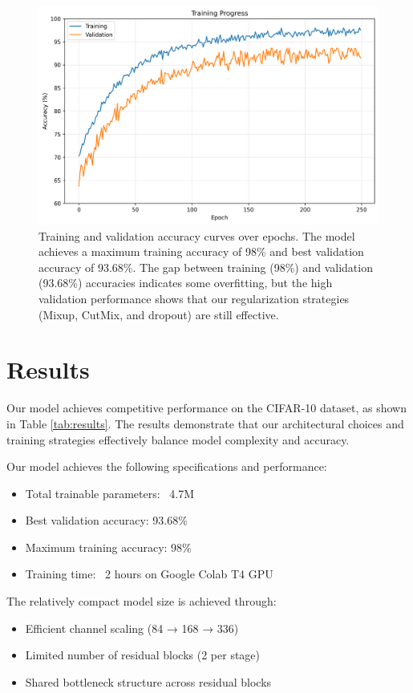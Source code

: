 \documentclass[letterpaper]{article} %
\begin{document}
\begin{figure}[t]
\centering
\includegraphics[width=0.95\columnwidth]{training_curves.png}
\caption{Training and validation accuracy curves over epochs. The model achieves a maximum training accuracy of 98\% and best validation accuracy of 93.68\%. The gap between training (98\%) and validation (93.68\%) accuracies indicates some overfitting, but the high validation performance shows that our regularization strategies (Mixup, CutMix, and dropout) are still effective.}
\label{fig:training}
\end{figure}

\section{Results}
Our model achieves competitive performance on the CIFAR-10 dataset, as shown in Table \ref{tab:results}. The results demonstrate that our architectural choices and training strategies effectively balance model complexity and accuracy.

Our model achieves the following specifications and performance:

\begin{itemize}
    \item Total trainable parameters: ~4.7M
    \item Best validation accuracy: 93.68\%
    \item Maximum training accuracy: 98\%
    \item Training time: ~2 hours on Google Colab T4 GPU
\end{itemize}

The relatively compact model size is achieved through:
\begin{itemize}
    \item Efficient channel scaling (84 → 168 → 336)
    \item Limited number of residual blocks (2 per stage)
    \item Shared bottleneck structure across residual blocks
\end{itemize}
\end{document}
